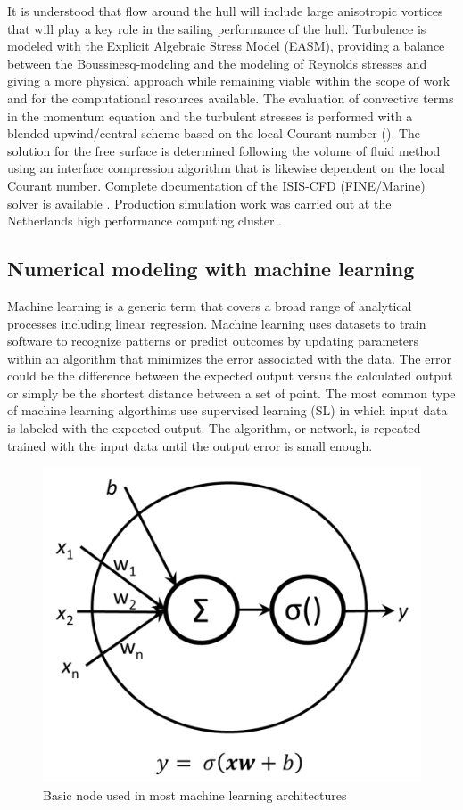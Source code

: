 \documentclass[twoside,twocolumn]{article}
\begin{document}
It is understood that flow around the hull will include large anisotropic vortices that will play a key role in the sailing performance of the hull. Turbulence is modeled with the Explicit Algebraic Stress Model (EASM), providing a balance between the Boussinesq-modeling and the modeling of Reynolds stresses and giving a more physical approach while remaining viable within the scope of work and for the computational resources available. The evaluation of convective terms in the momentum equation and the turbulent stresses is performed with a blended upwind/central scheme based on the local Courant number (\Co). The solution for the free surface is determined following the volume of fluid method using an interface compression algorithm that is likewise dependent on the local Courant number. Complete documentation of the ISIS-CFD (FINE/Marine) solver is available \cite{Numeca1}. Production simulation work was carried out at the Netherlands high performance computing cluster \cite{SARA1}.

\subsection{Numerical modeling with machine learning}

Machine learning is a generic term that covers a broad range of analytical processes including linear regression. Machine learning uses datasets to train software to recognize patterns or predict outcomes by updating parameters within an algorithm that minimizes the error associated with the data. The error could be the difference between the expected output versus the calculated output or simply be the shortest distance between a set of point. The most common type of machine learning algorthims use supervised learning (SL) in which input data is labeled with the expected output. The algorithm, or network, is repeated trained with the input data until the output error is small enough.

\begin{figure}[!h]
	\centering
	\includegraphics[width=.7\columnwidth]{images/node.png}  %
	\caption{Basic node used in most machine learning architectures }
	\label{fig:node}
\end{figure}
\end{document}
